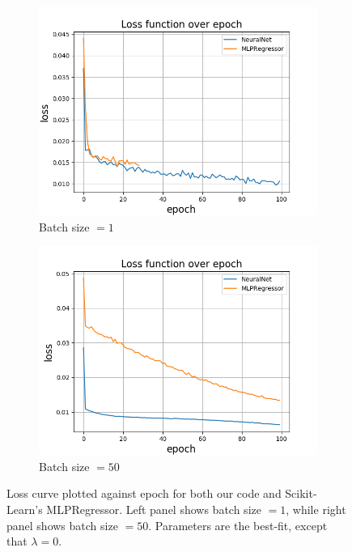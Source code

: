 \documentclass[a4paper]{article}
\begin{document}
\begin{figure}[H]
  \centering
  \begin{subfigure}{0.49\textwidth}
    \includegraphics[scale=0.45]{../figures/task_b/minibatch1/loss.png}
    \caption{Batch size $=1$}
  \end{subfigure}
  \begin{subfigure}{0.49\textwidth}
    \includegraphics[scale=0.45]{../figures/task_b/minibatch50/loss.png}
    \caption{Batch size $=50$}
  \end{subfigure}
  \caption{Loss curve plotted against epoch for both our code and Scikit-Learn's MLPRegressor. Left panel shows batch size $=1$, while right panel shows batch size $=50$. Parameters are the best-fit, except that $\lambda = 0$.}
  \label{fig:nn_franke_skl}
\end{figure}
\end{document}
